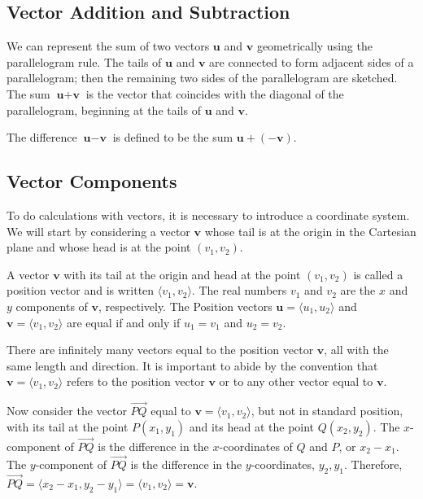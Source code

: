 \documentclass[../calc3.tex]{subfiles}
\begin{document}
\subsection*{Vector Addition and Subtraction}
We can represent the sum of two vectors $\textbf{u}$ and $\textbf{v}$ geometrically using the parallelogram rule. The tails of $\textbf{u}$ and $\textbf{v}$ are connected to form adjacent sides of a parallelogram; 
then the remaining two sides of the parallelogram are sketched. The sum $\textbf{u}+\textbf{v}$ is the vector that coincides with the diagonal of the parallelogram, beginning at the tails of $\textbf{u}$ and $\textbf{v}$.

The difference $\textbf{u}-\textbf{v}$ is defined to be the sum $\textbf{u} + (-\textbf{v})$. 

\subsection*{Vector Components}
To do calculations with vectors, it is necessary to introduce a coordinate system. We will start by considering a vector $\textbf{v}$ whose tail is at the origin in the Cartesian plane and whose head is at the point $(v_1,v_2)$.

\begin{definition}
    A vector $\textbf{v}$ with its tail at the origin and head at the point $(v_1,v_2)$ is called a position vector and is written $\langle v_1,v_2\rangle$.
    The real numbers $v_1$ and $v_2$ are the $x$ and $y$ components of $\textbf{v}$, respectively. The Position vectors $\textbf{u}=\langle u_1,u_2\rangle$ and $\textbf{v}=\langle v_1,v_2\rangle$ are equal if and only if $u_1=v_1$ and $u_2=v_2$.
\end{definition}

There are infinitely many vectors equal to the position vector $\textbf{v}$, all with the same length and direction. It is important to abide by the convention that $\textbf{v}=\langle v_1,v_2\rangle$ refers to the position vector $\textbf{v}$ or to any other vector equal to $\textbf{v}$.

Now consider the vector $\vec{PQ}$ equal to $\textbf{v}=\langle v_1,v_2\rangle$, but not in standard position, with its tail at the point $P(x_1,y_1)$ and its head at the point $Q(x_2,y_2)$. The $x$-component of $\vec{PQ}$ is the difference in the $x$-coordinates of $Q$ and $P$, or $x_2-x_1$. The $y$-component 
of $\vec{PQ}$ is the difference in the $y$-coordinates, $y_2,y_1$. Therefore, $\vec{PQ}=\langle x_2-x_1,y_2-y_1\rangle = \langle v_1,v_2\rangle = \textbf{v}$.
\end{document}
